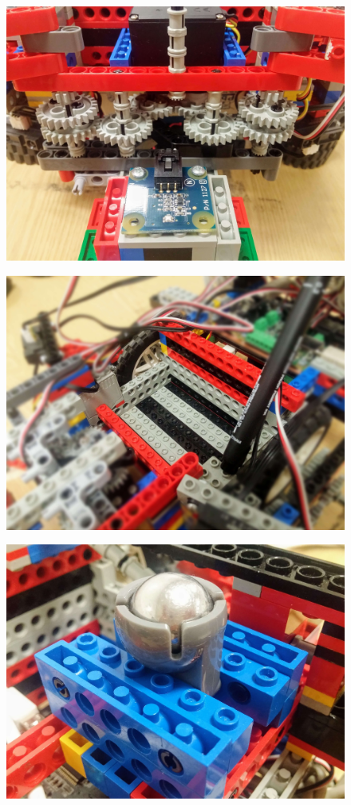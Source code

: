 \begin{figure}[ht]
    \centering
    \includegraphics[width=0.7\linewidth]{res/robot-pics/gripper-gear-train.jpg}
    \caption{}
    \label{fig:}
\end{figure}

\begin{figure}[ht]
    \centering
    \includegraphics[width=0.7\linewidth]{res/robot-pics/battery-slot.jpg}
    \caption{}
    \label{fig:}
\end{figure}

\begin{figure}[ht]
    \centering
    \includegraphics[width=0.7\linewidth]{res/robot-pics/ball-caster-wheel.jpg}
    \caption{}
    \label{fig:}
\end{figure}
